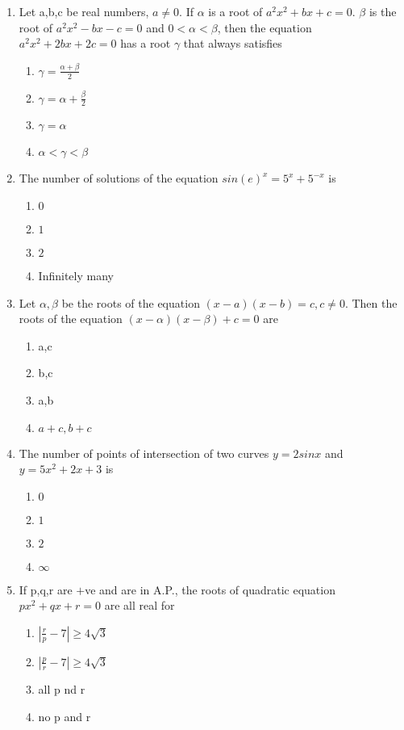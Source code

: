 \documentclass[journal,12pt,twocolumn]{IEEEtran}
\begin{document}
\begin{enumerate}[label=\arabic*]
\item Let a,b,c be real numbers, $a\neq0$. If $\alpha$ is a root of $a^{2}x^{2}+bx+c=0$. $\beta$ is the root of $a^{2}x^{2}-bx-c=0$ and $0<\alpha<\beta$, then the equation $a^{2}x^{2}+2bx+2c=0$ has a root $\gamma$ that always satisfies
\begin{enumerate}
\item $\gamma = \frac{\alpha+\beta}{2}$
\item $\gamma = \alpha+\frac{\beta}{2}$ 
\item $\gamma = \alpha$
\item $\alpha<\gamma<\beta$
\end{enumerate}

\item The number of solutions of the equation $sin(e)^{x}=5^{x}+5^{-x}$ is
\begin{enumerate}
\item $0$
\item $1$ 
\item $2$
\item Infinitely many
\end{enumerate}

\item Let $\alpha, \beta$ be the roots of the equation $(x-a)(x-b)=c, c\neq0$. Then the roots of the equation $(x-\alpha)(x-\beta)+c=0$ are
\begin{enumerate}
\item a,c
\item b,c 
\item a,b
\item $a+c,b+c$
\end{enumerate}

\item The number of points of intersection of two curves $y=2 sinx$ and $y=5x^{2}+2x+3$ is
\begin{enumerate}
\item $0$
\item $1$ 
\item $2$
\item $\infty$ 
\end{enumerate}

\item If p,q,r are $+$ve and are in A.P., the roots of quadratic equation $px^{2}+qx+r=0$ are all real for
\begin{enumerate}
\item $|\frac{r}{p}-7|\geq{4\sqrt{3}}$
\item $|\frac{p}{r}-7|\geq{4\sqrt{3}}$ 
\item all p nd r
\item no p and r 
\end{enumerate}


\end{enumerate}
\end{document}
